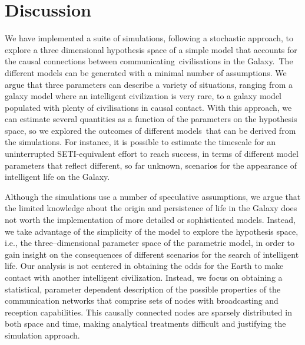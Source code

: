 \documentclass[crop]{CSLB}
\begin{document}




\section{Discussion}\label{S_discussion}


We have implemented a suite of simulations, following a stochastic approach, to explore a three dimensional hypothesis space of a simple model that accounts for the causal connections between communicating civilisations in the Galaxy. The different models can be generated with a minimal number of assumptions. We argue that three parameters can describe a variety of situations, ranging from a galaxy model where an intelligent civilization is very rare, to a galaxy model populated with plenty of civilisations in causal contact. With this approach, we can estimate several quantities as a function of the parameters on the hypothesis space, so we explored the outcomes of different models that can be derived from the simulations. For instance, it is possible to estimate the timescale for an uninterrupted SETI-equivalent effort to reach success, in terms of different model parameters that reflect different, so far unknown, scenarios for the appearance of intelligent life on the Galaxy.





Although the simulations use a number of speculative assumptions, we
argue that the limited knowledge about the origin and persistence of
life in the Galaxy does not worth the implementation of more detailed
or sophisticated models.
%
Instead, we take advantage of the simplicity of the model to explore
the hypothesis space, i.e., the three--dimensional parameter space of
the parametric model, in order to gain insight on the consequences of
different scenarios for the search of intelligent life.
%
Our analysis is not centered in obtaining the odds for the Earth
to make contact with another intelligent civilization.
%
Instead, we focus on obtaining a statistical, parameter dependent
description of the possible properties of the communication networks
that comprise sets of nodes with broadcasting and reception
capabilities.
%
This causally connected nodes are sparsely distributed in both space
and time, making analytical treatments difficult and justifying
the simulation approach.
\end{document}
